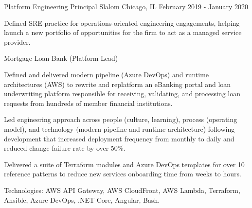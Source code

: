 \begin{cventries}
  \cventry
    {Platform Engineering Principal} %
    {Slalom} %
    {Chicago, IL} %
    {February 2019 - January 2020} %
    {
      \begin{cvitems} %
        \item {Defined SRE practice for operations-oriented engineering engagements, helping launch a new portfolio of opportunities for the firm to act as a managed service provider.}
      \end{cvitems}
    }

  \cventry
    {Mortgage Loan Bank (Platform Lead)} %
    {} %
    {} %
    {} %
    {
      \begin{cvitems} %
        \item {Defined and delivered modern pipeline (Azure DevOps) and runtime architectures (AWS) to rewrite and replatform an eBanking portal and loan underwriting platform responsible for receiving, validating, and processing loan requests from hundreds of member financial institutions.}
        \item {Led engineering approach across people (culture, learning), process (operating model), and technology (modern pipeline and runtime architecture) following development that increased deployment frequency from monthly to daily and reduced change failure rate by over 50\%.}
        \item {Delivered a suite of Terraform modules and Azure DevOps templates for over 10 reference patterns to reduce new services onboarding time from weeks to hours.}
        \item {Technologies: AWS API Gateway, AWS CloudFront, AWS Lambda, Terraform, Ansible, Azure DevOps, .NET Core, Angular, Bash.}
      \end{cvitems}
    }


\end{cventries}
